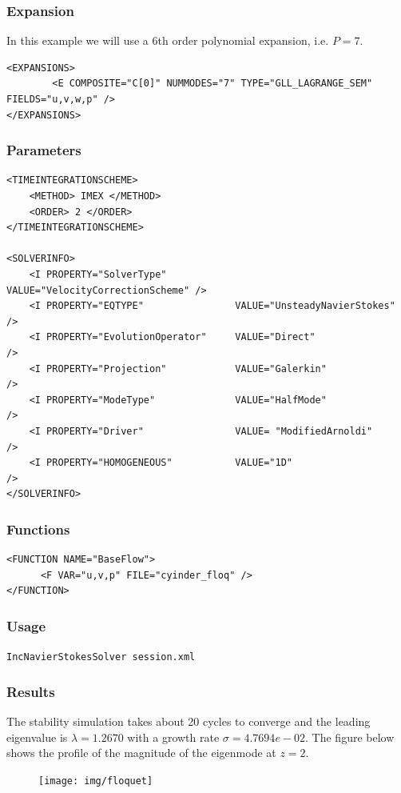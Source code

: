 \subsubsection{Expansion}

In this example we will use a 6th order polynomial expansion, i.e. $P=7$.

 \begin{lstlisting}[style=XMLStyle]
<EXPANSIONS>
        <E COMPOSITE="C[0]" NUMMODES="7" TYPE="GLL_LAGRANGE_SEM" FIELDS="u,v,w,p" />
</EXPANSIONS>
                                            \end{lstlisting}


\subsubsection{Parameters}

 \begin{lstlisting}[style=XMLStyle]
<TIMEINTEGRATIONSCHEME>
    <METHOD> IMEX </METHOD>
    <ORDER> 2 </ORDER>
</TIMEINTEGRATIONSCHEME>

<SOLVERINFO>
    <I PROPERTY="SolverType"            VALUE="VelocityCorrectionScheme" />
    <I PROPERTY="EQTYPE"                VALUE="UnsteadyNavierStokes"     />
    <I PROPERTY="EvolutionOperator"     VALUE="Direct"                   />
    <I PROPERTY="Projection"            VALUE="Galerkin"                 />
    <I PROPERTY="ModeType"              VALUE="HalfMode"                 />
    <I PROPERTY="Driver"                VALUE= "ModifiedArnoldi"         />
    <I PROPERTY="HOMOGENEOUS"           VALUE="1D"                       />
</SOLVERINFO>
                                            \end{lstlisting}


\subsubsection{Functions}

 \begin{lstlisting}[style=XMLStyle]
<FUNCTION NAME="BaseFlow">
      <F VAR="u,v,p" FILE="cyinder_floq" />
</FUNCTION>
                                            \end{lstlisting}


  \subsubsection{Usage}

\texttt{IncNavierStokesSolver session.xml}

\subsubsection{Results}

The stability simulation takes about 20 cycles to converge and the leading eigenvalue is $\lambda=1.2670$ with a growth rate $\sigma=4.7694e-02$. The figure below shows the profile of the magnitude of the eigenmode at $z=2$.

\begin{figure}[!htbp]
\centering
 {\texttt{[image: img/floquet]}}
   \caption {}
\end{figure}

